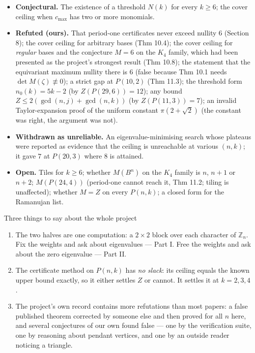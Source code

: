 \documentclass[11pt]{article}
\begin{document}
\begin{itemize}[leftmargin=*]
  \item \textbf{Conjectural.} The existence of a threshold $N(k)$ for every $k\ge6$; the cover ceiling when $c_{\max}$ has two or more monomials.
  \item \textbf{Refuted (ours).} That period-one certificates never exceed nullity $6$ (Section 8); the cover ceiling for arbitrary bases (Thm 10.4); the cover ceiling for \emph{regular} bases and the conjecture $M=6$ on the $K_4$ family, which had been presented as the project's strongest result (Thm 10.8); the statement that the equivariant maximum nullity there is $6$ (false because Thm 10.1 needs $\det M(\zeta)\not\equiv0$); a strict gap at $P(10,2)$ (Thm 11.3); the threshold form $n_0(k)=5k-2$ (by $Z(P(29,6))=12$); any bound $Z\le2(\gcd(n,j)+\gcd(n,k))$ (by $Z(P(11,3))=7$); an invalid Taylor-expansion proof of the uniform constant $\pi(2+\sqrt2)$ (the constant was right, the argument was not).
  \item \textbf{Withdrawn as unreliable.} An eigenvalue-minimising search whose plateaus were reported as evidence that the ceiling is unreachable at various $(n,k)$; it gave $7$ at $P(20,3)$ where $8$ is attained.
  \item \textbf{Open.} Tiles for $k\ge6$; whether $M(B^n)$ on the $K_4$ family is $n$, $n+1$ or $n+2$; $M(P(24,4))$ (period-one cannot reach it, Thm 11.2; tiling is unaffected); whether $M=Z$ on every $P(n,k)$; a closed form for the Ramanujan list.
\end{itemize}

\begin{callbox}{Three things to say about the whole project}
\begin{enumerate}[leftmargin=*,nosep]
  \item The two halves are one computation: a $2\times2$ block over each character of $\mathbb Z_n$. Fix the weights and ask about eigenvalues --- Part I. Free the weights and ask about the zero eigenvalue --- Part II.
  \item The certificate method on $P(n,k)$ has \emph{no slack}: its ceiling equals the known upper bound exactly, so it either settles $Z$ or cannot. It settles it at $k=2,3,4$.
  \item The project's own record contains more refutations than most papers: a false published theorem corrected by someone else and then proved for all $n$ here, and several conjectures of our own found false --- one by the verification suite, one by reasoning about pendant vertices, and one by an outside reader noticing a triangle.
\end{enumerate}
\end{callbox}
\end{document}
